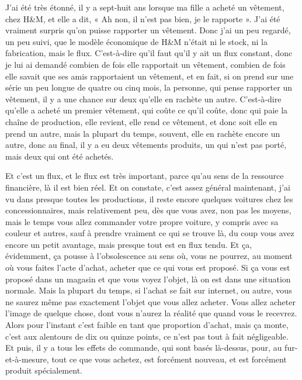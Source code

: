\begin{description}
J'ai été très étonné, il y a sept-huit ans lorsque ma fille a acheté un vêtement, chez H\&M, et elle a dit, « Ah non, il n'est pas bien, je le rapporte ». J'ai été vraiment surpris qu'on puisse rapporter un vêtement. Donc j'ai un peu regardé, un peu suivi, que le modèle économique de H\&M n'était ni le stock, ni la fabrication, mais le flux. C'est-à-dire qu'il faut qu'il y ait un flux constant, donc je lui ai demandé combien de fois elle rapportait un vêtement, combien de fois elle savait que ses amis rapportaient un vêtement, et en fait, si on prend sur une série un peu longue de quatre ou cinq mois, la personne, qui pense rapporter un vêtement, il y a une chance sur deux qu'elle en rachète un autre. C'est-à-dire qu'elle a acheté un premier vêtement, qui coûte ce qu'il coûte, donc qui paie la chaîne de production, elle revient, elle rend ce vêtement, et donc soit elle en prend un autre, mais la plupart du temps, souvent, elle en rachète encore un autre, donc au final, il y a eu deux vêtements produits, un qui n'est pas porté, mais deux qui ont été achetés. 

Et c'est un flux, et le flux est très important, parce qu’au sens de la ressource financière, là il est bien réel. Et on constate, c'est assez général maintenant, j'ai vu dans presque toutes les productions, il reste encore quelques voitures chez les concessionnaires, mais relativement peu, dès que vous avez, non pas les moyens, mais le temps vous allez commander votre propre voiture, y compris avec sa couleur et autres, sauf à prendre vraiment ce qui se trouve là, du coup vous avez encore un petit avantage, mais presque tout est en flux tendu. Et ça, évidemment, ça pousse à l'obsolescence au sens où, vous ne pourrez, au moment où vous faites l'acte d'achat, acheter que ce qui vous est proposé. Si ça vous est proposé dans un magasin et que vous voyez l'objet, là on est dans une situation normale. Mais la plupart du temps, si l'achat se fait sur internet, ou autre, vous ne saurez même pas exactement l'objet que vous allez acheter. Vous allez acheter l'image de quelque chose, dont vous n'aurez la réalité que quand vous le recevrez. Alors pour l'instant c'est faible en tant que proportion d'achat, mais ça monte, c'est aux alentours de dix ou quinze points, ce n'est pas tout à fait négligeable. Et puis, il y a tous les effets de commande, qui sont basés là-dessus, pour, au fur-et-à-mesure, tout ce que vous achetez, est forcément nouveau, et est forcément produit spécialement. 


\end{description}
